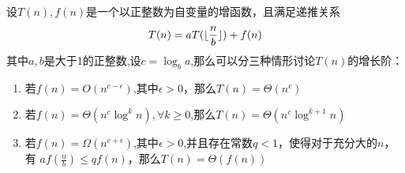 \documentclass{article}
\DeclarePairedDelimiter{\floor}{\lfloor}{\rfloor}
\begin{document}
设$T(n),f(n)$是一个以正整数为自变量的增函数，且满足递推关系
\begin{equation}\label{eq:DefTn}
T(n)=aT(\floor{\frac{n}{b}})+f(n)
\end{equation}
其中$a,b$是大于1的正整数,设$c=\log_b a$,那么可以分三种情形讨论$T(n)$的增长阶：
\begin{enumerate}
\item 若$f(n)=O(n^{c-\epsilon})$,其中$\epsilon>0$，那么$T(n)=\Theta(n^c)$
\item 若$f(n)=\Theta(n^c \log^k n),\forall k\geq 0$,那么$T(n)=\Theta(n^c \log^{k+1} n)$
\item 若$f(n)=\Omega(n^{c+\epsilon})$,其中$\epsilon>0$,并且存在常数$q<1$，使得对于充分大的$n$，有
$af(\frac{n}{b})\leq qf(n)$，那么$T(n)=\Theta (f(n))$
\end{enumerate}
\end{document}
